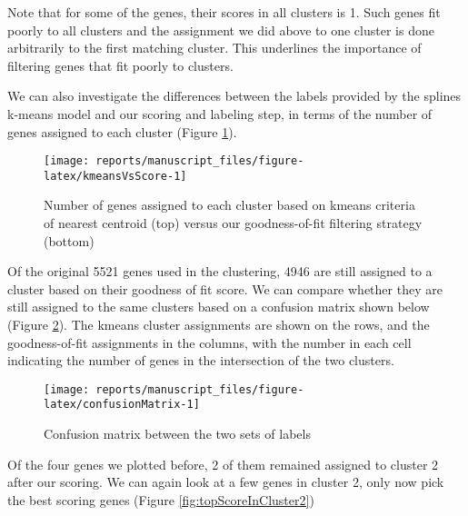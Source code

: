 \documentclass[9pt,a4paper,]{extarticle}
\begin{document}
Note that for some of the genes, their scores in all clusters is 1. Such genes fit
poorly to all clusters and the assignment we did above to one cluster is done arbitrarily to the first matching cluster.
This underlines the importance of filtering genes that fit poorly to clusters.

We can also investigate the
differences between the labels provided by the splines k-means model and our
scoring and labeling step, in terms of the number of genes assigned to each cluster (Figure \ref{fig:kmeansVsScore}).

\begin{figure}[H]

{\centering \texttt{[image: reports/manuscript\_files/figure-latex/kmeansVsScore-1]} 

}

\caption{Number of genes assigned to each cluster based on kmeans criteria of nearest centroid (top) versus our goodness-of-fit filtering strategy (bottom)}\label{fig:kmeansVsScore}
\end{figure}

Of the original 5521 genes used in the
clustering, 4946 are still assigned to a cluster based on their goodness of
fit score. We can compare whether they are still assigned to the same clusters
based on a confusion matrix shown below (Figure \ref{fig:confusionMatrix}). The kmeans cluster assignments are
shown on the rows, and the goodness-of-fit assignments in the columns, with
the number in each cell indicating the number of genes in the intersection of
the two clusters.

\begin{figure}[H]

{\centering \texttt{[image: reports/manuscript\_files/figure-latex/confusionMatrix-1]} 

}

\caption{Confusion matrix between the two sets of labels}\label{fig:confusionMatrix}
\end{figure}

Of the four genes we plotted before, 2 of them remained assigned to cluster 2 after our scoring. We can again look at a
few genes in cluster 2, only now pick the best scoring genes (Figure \ref{fig:topScoreInCluster2})
\end{document}
